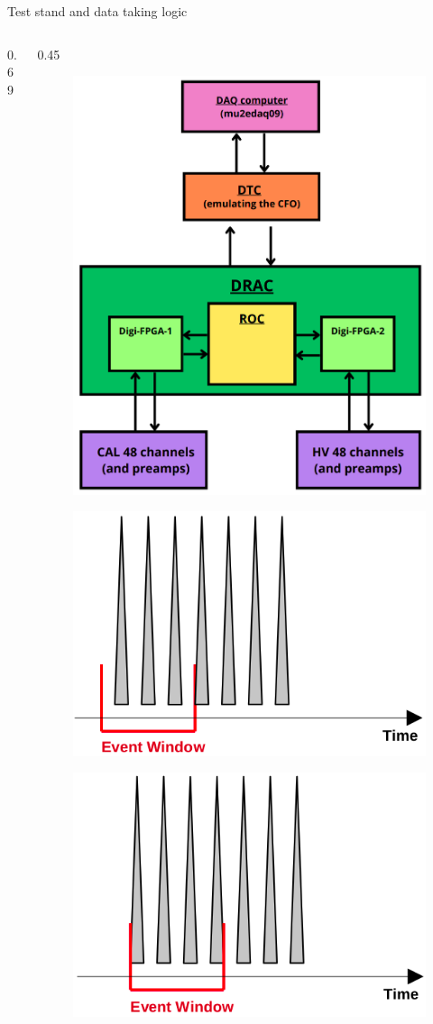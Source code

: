 \documentclass{beamer}
\begin{document}
\begin{frame}{Test stand and data taking logic}
\begin{columns}
\begin{column}{0.69\framewidth}
\begin{itemize}
{}
      \end{itemize}
          \end{column}
\begin{column}{0.45\framewidth}
        \begin{figure}[h]
          \centering
            \includegraphics[width=0.7\columnwidth]{figures/png/Screenshot_20240712_102528.png}
          \label{fig:enter-label} 
      \end{figure} 
      \vspace{-4mm}
      \begin{figure}[h!]
        \centering
        \includegraphics[width=0.55\columnwidth]{figures/png/Screenshot_20241013_113750.png}
        \label{fig:enter-label} 
    \end{figure}
    \vspace{-5mm}
      \begin{figure}[h!]
        \centering
        \includegraphics[width=0.55\columnwidth]{figures/png/Screenshot_20241013_113809.png}

\end{figure}
\end{column}
\end{columns}
\end{frame}
\end{document}

